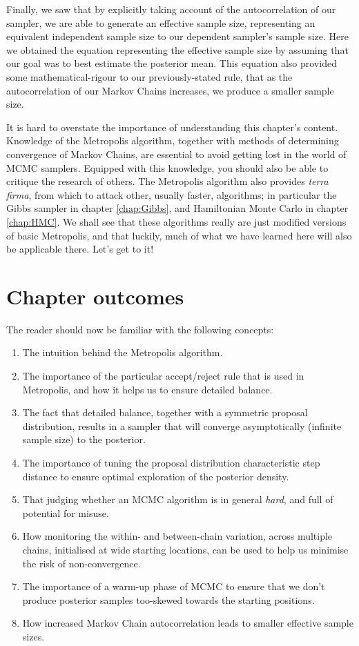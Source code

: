 \documentclass[11pt,fullpage]{book}
\begin{document}
Finally, we saw that by explicitly taking account of the autocorrelation of our sampler, we are able to generate an effective sample size, representing an equivalent independent sample size to our dependent sampler's sample size. Here we obtained the equation representing the effective sample size by assuming that our goal was to best estimate the posterior mean. This equation also provided some mathematical-rigour to our previously-stated rule, that as the autocorrelation of our Markov Chains increases, we produce a smaller sample size.

It is hard to overstate the importance of understanding this chapter's content. Knowledge of the Metropolis algorithm, together with methods of determining convergence of Markov Chains, are essential to avoid getting lost in the world of MCMC samplers. Equipped with this knowledge, you should also be able to critique the research of others. The Metropolis algorithm also provides \textit{terra firma}, from which to attack other, usually faster, algorithms; in particular the Gibbs sampler in chapter \ref{chap:Gibbs}, and Hamiltonian Monte Carlo in chapter \ref{chap:HMC}. We shall see that these algorithms really are just modified versions of basic Metropolis, and that luckily, much of what we have learned here will also be applicable there. Let's get to it!

\section{Chapter outcomes}
The reader should now be familiar with the following concepts:

\begin{enumerate}
\item The intuition behind the Metropolis algorithm.
\item The importance of the particular accept/reject rule that is used in Metropolis, and how it helps us to ensure detailed balance. 
\item The fact that detailed balance, together with a symmetric proposal distribution, results in a sampler that will converge asymptotically (infinite sample size) to the posterior.
\item The importance of tuning the proposal distribution characteristic step distance to ensure optimal exploration of the posterior density.
\item That judging whether an MCMC algorithm is in general \textit{hard}, and full of potential for misuse.
\item How monitoring the within- and between-chain variation, across multiple chains, initialised at wide starting locations, can be used to help us minimise the risk of non-convergence. 
\item The importance of a warm-up phase of MCMC to ensure that we don't produce posterior samples too-skewed towards the starting positions.
\item How increased Markov Chain autocorrelation leads to smaller effective sample sizes.
\end{enumerate}
\end{document}
